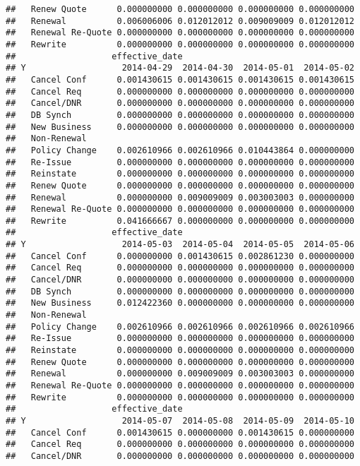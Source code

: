 \documentclass[]{article}
\begin{document}
\begin{verbatim}
##   Renew Quote      0.000000000 0.000000000 0.000000000 0.000000000
##   Renewal          0.006006006 0.012012012 0.009009009 0.012012012
##   Renewal Re-Quote 0.000000000 0.000000000 0.000000000 0.000000000
##   Rewrite          0.000000000 0.000000000 0.000000000 0.000000000
##                   effective_date
## Y                   2014-04-29  2014-04-30  2014-05-01  2014-05-02
##   Cancel Conf      0.001430615 0.001430615 0.001430615 0.001430615
##   Cancel Req       0.000000000 0.000000000 0.000000000 0.000000000
##   Cancel/DNR       0.000000000 0.000000000 0.000000000 0.000000000
##   DB Synch         0.000000000 0.000000000 0.000000000 0.000000000
##   New Business     0.000000000 0.000000000 0.000000000 0.000000000
##   Non-Renewal                                                     
##   Policy Change    0.002610966 0.002610966 0.010443864 0.000000000
##   Re-Issue         0.000000000 0.000000000 0.000000000 0.000000000
##   Reinstate        0.000000000 0.000000000 0.000000000 0.000000000
##   Renew Quote      0.000000000 0.000000000 0.000000000 0.000000000
##   Renewal          0.000000000 0.009009009 0.003003003 0.000000000
##   Renewal Re-Quote 0.000000000 0.000000000 0.000000000 0.000000000
##   Rewrite          0.041666667 0.000000000 0.000000000 0.000000000
##                   effective_date
## Y                   2014-05-03  2014-05-04  2014-05-05  2014-05-06
##   Cancel Conf      0.000000000 0.001430615 0.002861230 0.000000000
##   Cancel Req       0.000000000 0.000000000 0.000000000 0.000000000
##   Cancel/DNR       0.000000000 0.000000000 0.000000000 0.000000000
##   DB Synch         0.000000000 0.000000000 0.000000000 0.000000000
##   New Business     0.012422360 0.000000000 0.000000000 0.000000000
##   Non-Renewal                                                     
##   Policy Change    0.002610966 0.002610966 0.002610966 0.002610966
##   Re-Issue         0.000000000 0.000000000 0.000000000 0.000000000
##   Reinstate        0.000000000 0.000000000 0.000000000 0.000000000
##   Renew Quote      0.000000000 0.000000000 0.000000000 0.000000000
##   Renewal          0.000000000 0.009009009 0.003003003 0.000000000
##   Renewal Re-Quote 0.000000000 0.000000000 0.000000000 0.000000000
##   Rewrite          0.000000000 0.000000000 0.000000000 0.000000000
##                   effective_date
## Y                   2014-05-07  2014-05-08  2014-05-09  2014-05-10
##   Cancel Conf      0.001430615 0.000000000 0.001430615 0.000000000
##   Cancel Req       0.000000000 0.000000000 0.000000000 0.000000000
##   Cancel/DNR       0.000000000 0.000000000 0.000000000 0.000000000

\end{verbatim}
\end{document}
